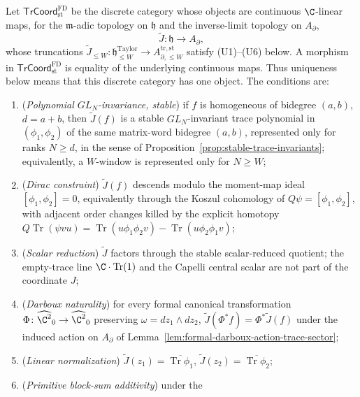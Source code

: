 \documentclass[11pt]{memoir}
\begin{document}
\begin{thm}
  Let \(\mathsf{TrCoord}^{\mathrm{FD}}_{\mathrm{st}}\) be the discrete
  category whose objects are continuous \(\C\)-linear maps, for the
  \(\mathfrak m\)-adic topology on \(\mathfrak h\) and the
  inverse-limit topology on \(A_\partial\),
  \[
    \widetilde J\colon\mathfrak h\longrightarrow A_\partial,
  \]
  whose truncations \(\widetilde J_{\leq W}\colon
  \mathfrak h^{\mathrm{Taylor}}_{\leq W}\to A_{\partial,\leq W}^{\mathrm{tr,st}}\)
  satisfy \textup{(U1)}--\textup{(U6)} below.  A morphism in
  \(\mathsf{TrCoord}^{\mathrm{FD}}_{\mathrm{st}}\) is equality of the
  underlying continuous maps.  Thus uniqueness below means that this
  discrete category has one object.  The conditions are:
  \begin{enumerate}[label=(U\arabic*)]
    \item (\emph{Polynomial \(GL_N\)-invariance, stable})
      if \(f\) is homogeneous of bidegree \((a,b)\), \(d=a+b\), then
      \(\widetilde J(f)\) is a stable \(GL_N\)-invariant trace
      polynomial in \((\phi_1,\phi_2)\) of the same matrix-word bidegree
      \((a,b)\), represented only for ranks \(N\geq d\), in the sense of
      Proposition~\ref{prop:stable-trace-invariants}; equivalently, a
      \(W\)-window is represented only for \(N\geq W\);
    \item (\emph{Dirac constraint}) \(\widetilde J(f)\) descends modulo
      the moment-map ideal \([\phi_1,\phi_2]=0\), equivalently through
      the Koszul cohomology of \(Q\psi=[\phi_1,\phi_2]\), with
      adjacent order changes killed by the explicit homotopy
      \(Q\operatorname{Tr}(\psi vu)
        =\operatorname{Tr}(u\phi_1\phi_2v)
          -\operatorname{Tr}(u\phi_2\phi_1v)\);
    \item (\emph{Scalar reduction}) \(\widetilde J\) factors through the
      stable scalar-reduced quotient; the empty-trace line
      \(\C\cdot\operatorname{Tr}(1)\) and the Capelli central scalar are
      not part of the coordinate \(J\);
    \item (\emph{Darboux naturality}) for every formal canonical
      transformation \(\Phi\colon\widehat{\C^2}_0\to\widehat{\C^2}_0\)
      preserving \(\omega=dz_1\wedge dz_2\),
      \(\widetilde J(\Phi^*f)=\Phi^*\widetilde J(f)\) under the induced
      action on \(A_\partial\) of
      Lemma~\ref{lem:formal-darboux-action-trace-sector};
    \item (\emph{Linear normalization})
      \(\widetilde J(z_1)=\overline{\operatorname{Tr}\phi_1}\),
      \(\widetilde J(z_2)=\overline{\operatorname{Tr}\phi_2}\);
    \item (\emph{Primitive block-sum additivity}) under the

\end{enumerate}
\end{thm}
\end{document}
